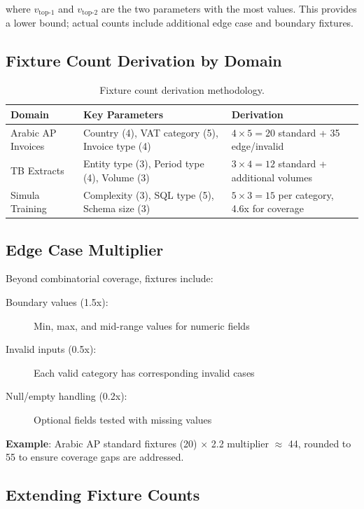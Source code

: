 \noindent
where $v_{\text{top-}1}$ and $v_{\text{top-}2}$ are the two parameters with the
most values. This provides a lower bound; actual counts include additional
edge case and boundary fixtures.

\subsection{Fixture Count Derivation by Domain}

\begin{table}[htbp]
\centering
\caption{Fixture count derivation methodology.}
\label{tab:fixture-derivation}
\footnotesize
\begin{tabularx}{\textwidth}{@{}l l X@{}}
\toprule
\textbf{Domain} & \textbf{Key Parameters} & \textbf{Derivation} \\
\midrule
Arabic AP Invoices & 
  Country (4), VAT category (5), Invoice type (4) &
  $4 \times 5 = 20$ standard + 35 edge/invalid \\
TB Extracts &
  Entity type (3), Period type (4), Volume (3) &
  $3 \times 4 = 12$ standard + additional volumes \\
Simula Training &
  Complexity (3), SQL type (5), Schema size (3) &
  $5 \times 3 = 15$ per category, 4.6x for coverage \\
\bottomrule
\end{tabularx}
\end{table}

\subsection{Edge Case Multiplier}

Beyond combinatorial coverage, fixtures include:
\begin{description}
  \item[Boundary values (1.5x):] Min, max, and mid-range values for numeric fields
  \item[Invalid inputs (0.5x):] Each valid category has corresponding invalid cases
  \item[Null/empty handling (0.2x):] Optional fields tested with missing values
\end{description}

\noindent
\textbf{Example}: Arabic AP standard fixtures (20) $\times$ 2.2 multiplier $\approx$ 44,
rounded to 55 to ensure coverage gaps are addressed.

\subsection{Extending Fixture Counts}


